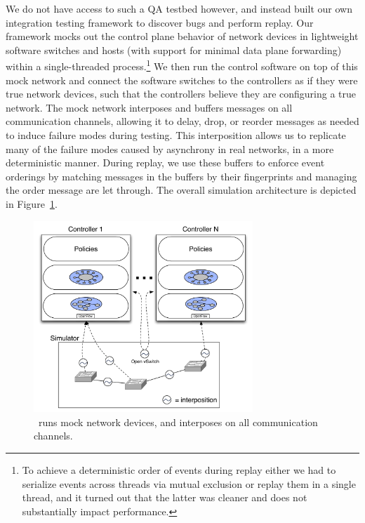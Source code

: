 We do not have access to such a QA testbed however, and instead built our own
integration testing framework to discover bugs and
perform replay. Our framework mocks out the control plane
behavior of network devices in lightweight software switches and hosts (with
support for minimal data plane forwarding)
within a single-threaded process.\footnote{To achieve a deterministic order of
events during replay either we had to serialize events across threads via
mutual exclusion or replay them in a single thread, and it turned out that
the latter was cleaner and does not substantially impact performance.} We then
run the control software on
top of this mock network and connect the software switches to the controllers as if they were true
network devices, such that the controllers believe they are configuring a true
network. The mock network interposes and buffers messages on all communication
channels, allowing it to delay, drop, or reorder
messages as needed to induce failure modes during testing. This interposition
allows us to replicate many of the failure modes caused by asynchrony in real
networks, in a more deterministic manner. During
replay, we use these buffers to enforce event orderings by
matching messages in the buffers by their fingerprints and managing
the order message are let through. The overall simulation architecture is depicted in
Figure~\ref{fig:architecture}.

\begin{figure}[t]
    \includegraphics[width=3.25in]{../diagrams/architecture/Debugger_Architecture.pdf}
    \caption[]{\label{fig:architecture} \projectname~runs mock
    network devices, and interposes on all communication
    channels. }
\end{figure}

